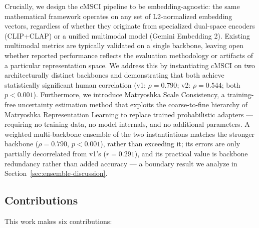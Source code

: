 \documentclass[a4paper,fleqn]{cas-sc}
\begin{document}
Crucially, we design the cMSCI pipeline to be embedding-agnostic: the same mathematical framework operates on any set of L2-normalized embedding vectors, regardless of whether they originate from specialized dual-space encoders (CLIP+CLAP) or a unified multimodal model (Gemini Embedding 2). Existing multimodal metrics are typically validated on a single backbone, leaving open whether reported performance reflects the evaluation methodology or artifacts of a particular representation space. We address this by instantiating cMSCI on two architecturally distinct backbones and demonstrating that both achieve statistically significant human correlation (v1: $\rho = 0.790$; v2: $\rho = 0.544$; both $p < 0.001$). Furthermore, we introduce Matryoshka Scale Consistency, a training-free uncertainty estimation method that exploits the coarse-to-fine hierarchy of Matryoshka Representation Learning \citep{kusupati2022matryoshka} to replace trained probabilistic adapters — requiring no training data, no model internals, and no additional parameters. A weighted multi-backbone ensemble of the two instantiations matches the stronger backbone ($\rho = 0.790$, $p < 0.001$), rather than exceeding it; its errors are only partially decorrelated from v1's ($r = 0.291$), and its practical value is backbone redundancy rather than added accuracy — a boundary result we analyze in Section~\ref{sec:ensemble-discussion}.

\subsection{Contributions}\label{sec:contributions}

This work makes six contributions:
\end{document}
